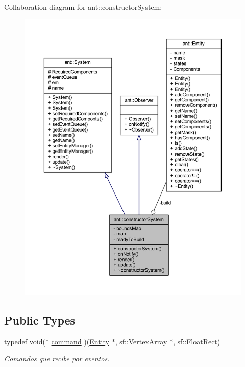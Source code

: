 Collaboration diagram for ant\+:\+:constructor\+System\+:
\nopagebreak
\begin{figure}[H]
\begin{center}
\leavevmode
\includegraphics[width=350pt]{df/d99/classant_1_1constructor_system__coll__graph}
\end{center}
\end{figure}
\subsection*{Public Types}
\begin{DoxyCompactItemize}
\item 
typedef void($\ast$ \hyperlink{classant_1_1constructor_system_a0977052dc8865f8e79ae03b4f3e18d8a}{command} )(\hyperlink{classant_1_1_entity}{Entity} $\ast$, sf\+::\+Vertex\+Array $\ast$, sf\+::\+Float\+Rect)
\begin{DoxyCompactList}\small\item\em Comandos que recibe por eventos. \end{DoxyCompactList}\end{DoxyCompactItemize}
